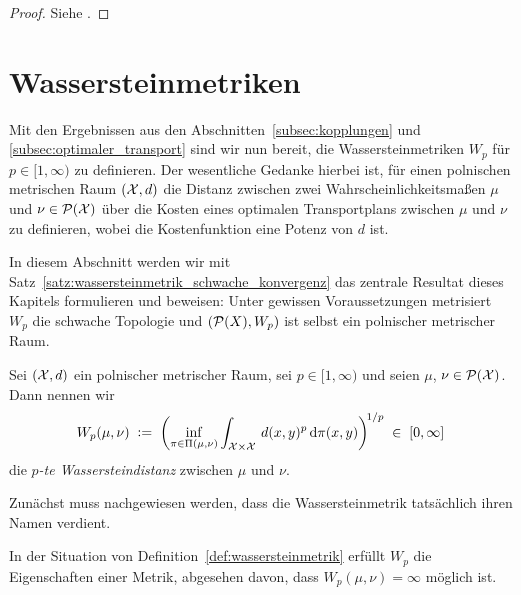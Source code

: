 \documentclass[../thesis/thesis.tex]{subfiles}
\begin{document}
	\begin{proof}
		Siehe \cite[Corollary 5.21]{Villani.2009}.
	\end{proof}

	\section{Wassersteinmetriken}
	\label{subsec:wassersteinmetriken}
	
	Mit den Ergebnissen aus den Abschnitten~\ref{subsec:kopplungen} und \ref{subsec:optimaler_transport} sind wir nun bereit, die Wassersteinmetriken $W_p$ für $p \in [1, \infty)$ zu definieren. Der wesentliche Gedanke hierbei ist,
	für einen polnischen metrischen Raum $(\mathcal{X}, d)$ die Distanz zwischen zwei Wahrscheinlichkeitsmaßen $\mu$ und $\nu \in \mathcal{P}(\mathcal{X})$ über die Kosten eines optimalen Transportplans zwischen $\mu$ und
	$\nu$ zu definieren, wobei die Kostenfunktion eine Potenz von $d$ ist.
	
	In diesem Abschnitt werden wir mit Satz~\ref{satz:wassersteinmetrik_schwache_konvergenz} das zentrale Resultat dieses Kapitels formulieren und beweisen: Unter gewissen Voraussetzungen metrisiert $W_p$ die schwache Topologie und $(\mathcal{P}(X), W_p)$ ist selbst ein polnischer metrischer Raum.

	\begin{Definition}
		\label{def:wassersteinmetrik}
		Sei $(\mathcal{X}, d)$ ein polnischer metrischer Raum, sei $p \in [1, \infty)$ und seien $\mu$, $\nu \in \mathcal{P}(\mathcal{X})$. Dann nennen wir
		$$ W_p(\mu, \nu) \; \vcentcolon = \; \left(\inf_{\pi \in \Pi(\mu, \nu)} \int_{\mathcal{X} \times \mathcal{X}} \, d(x, y)^p \, \mathrm{d}\pi(x, y)\right)^{\! 1/p} \; \in \; [0, \infty] $$
		die \emph{$p$-te Wassersteindistanz} zwischen $\mu$ und $\nu$.
	\end{Definition}

	Zunächst muss nachgewiesen werden, dass die Wassersteinmetrik tatsächlich ihren Namen verdient.

	\begin{Satz}
		\label{satz:wassersteinmetrik_ist_metrik}
		In der Situation von Definition~\ref{def:wassersteinmetrik} erfüllt $W_p$ die Eigenschaften einer Metrik, abgesehen davon, dass $W_p(\mu, \nu) = \infty$ möglich ist.
	\end{Satz}
\end{document}
